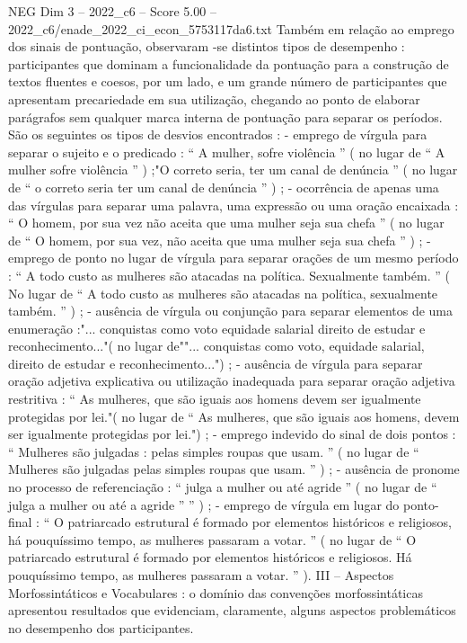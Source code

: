 \begin{textsample}{NEG Dim 3 – 2022\_c6 – Score 5.00 – 2022\_c6/enade\_2022\_ci\_econ\_5753117da6.txt}
Também em relação ao emprego dos sinais de pontuação, observaram -se distintos tipos de desempenho : participantes que dominam a funcionalidade da pontuação para a construção de textos fluentes e coesos, por um lado, e um grande número de participantes que apresentam precariedade em sua utilização, chegando ao ponto de elaborar parágrafos sem qualquer marca interna de pontuação para separar os períodos.
São os seguintes os tipos de desvios encontrados : - emprego de vírgula para separar o sujeito e o predicado : “ A mulher, sofre violência ” ( no lugar de “ A mulher sofre violência ” ) ;"O correto seria, ter um canal de denúncia ” ( no lugar de “ o correto seria ter um canal de denúncia ” ) ; - ocorrência de apenas uma das vírgulas para separar uma palavra, uma expressão ou uma oração encaixada : “ O homem, por sua vez não aceita que uma mulher seja sua chefa ” ( no lugar de “ O homem, por sua vez, não aceita que uma mulher seja sua chefa ” ) ; - emprego de ponto no lugar de vírgula para separar orações de um mesmo período : “ A todo custo as mulheres são atacadas na política.
Sexualmente também. ” ( No lugar de “ A todo custo as mulheres são atacadas na política, sexualmente também. ” ) ; - ausência de vírgula ou conjunção para separar elementos de uma enumeração :"... conquistas como voto equidade salarial direito de estudar e reconhecimento..."( no lugar de""... conquistas como voto, equidade salarial, direito de estudar e reconhecimento...") ; - ausência de vírgula para separar oração adjetiva explicativa ou utilização inadequada para separar oração adjetiva restritiva : “ As mulheres, que são iguais aos homens devem ser igualmente protegidas por lei."( no lugar de “ As mulheres, que são iguais aos homens, devem ser igualmente protegidas por lei.") ; - emprego indevido do sinal de dois pontos : “ Mulheres são julgadas : pelas simples roupas que usam. ” ( no lugar de “ Mulheres são julgadas pelas simples roupas que usam. ” ) ; - ausência de pronome no processo de referenciação : “ julga a mulher ou até agride ” ( no lugar de “ julga a mulher ou até a agride ” ” ) ; - emprego de vírgula em lugar do ponto-final : “ O patriarcado estrutural é formado por elementos históricos e religiosos, há pouquíssimo tempo, as mulheres passaram a votar. ” ( no lugar de “ O patriarcado estrutural é formado por elementos históricos e religiosos.
Há pouquíssimo tempo, as mulheres passaram a votar. ” ).
III – Aspectos Morfossintáticos e Vocabulares : o domínio das convenções morfossintáticas apresentou resultados que evidenciam, claramente, alguns aspectos problemáticos no desempenho dos participantes.

\end{textsample}
